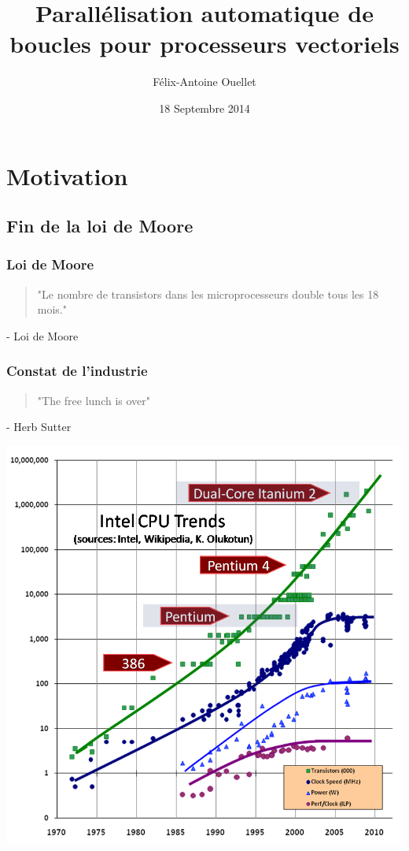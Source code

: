 \documentclass{beamer}
\author[Félix-Antoine Ouellet]{Félix-Antoine Ouellet}
\title[Autovectorization\hspace{2em}\insertframenumber/\inserttotalframenumber]{Parallélisation automatique de boucles pour processeurs vectoriels}
\institute{Université de Sherbrooke}
\date{18 Septembre 2014}
\begin{document}
\begin{frame}
\titlepage %
\end{frame}

\begin{frame}
\tableofcontents[hideallsubsections]
\end{frame}

\section{Motivation}
\subsection{Fin de la loi de Moore}
\begin{frame}
\frametitle{Loi de Moore}
\begin{center}
\begin{quote}
"Le nombre de transistors dans les microprocesseurs double tous les 18 mois."
\end{quote}
\end{center}
\hfill - Loi de Moore
\end{frame}

\begin{frame}
\frametitle{Constat de l'industrie}
\begin{center}
\begin{quote}
"The free lunch is over"
\end{quote}
\end{center}
\hfill - Herb Sutter
\end{frame}

\begin{frame}
\begin{center}
\colorbox{white}{\includegraphics[scale=0.45]{CPU.png}}
\end{center}
\end{frame}
\end{document}
